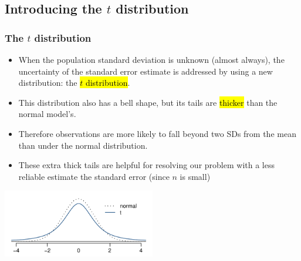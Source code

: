 
\subsection{Introducing the $t$ distribution}


\begin{frame}
\frametitle{The $t$ distribution}

\begin{itemize}

\item When the population standard deviation is unknown (almost always), the uncertainty of the standard error estimate is addressed by using a new distribution: the \hl{$t$ distribution}.

\pause

\item This distribution also has a bell shape, but its tails are \hl{thicker} than the normal model's.

\pause

\item Therefore observations are more likely to fall beyond two SDs from the mean than under the normal distribution.

\pause

\item These extra thick tails are helpful for resolving our problem with a less reliable estimate the standard error (since $n$ is small)

\end{itemize}

\begin{center}
\includegraphics[width=0.5\textwidth]{7-1_one_t/figures/tDistCompareToNormalDist/tDistCompareToNormalDist}
\end{center}

\end{frame}


